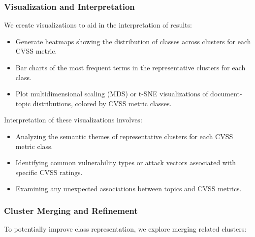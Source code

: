 \documentclass[12pt]{article}
\begin{document}
\subsubsection{Visualization and Interpretation}

We create visualizations to aid in the interpretation of results:

\begin{itemize}

	\item Generate heatmaps showing the distribution of classes across clusters for each CVSS metric.

	\item Bar charts of the most frequent terms in the representative clusters for each class.

	\item Plot multidimensional scaling (MDS) or t-SNE visualizations of document-topic distributions, colored by CVSS metric classes.

\end{itemize}

Interpretation of these visualizations involves:

\begin{itemize}

	\item Analyzing the semantic themes of representative clusters for each CVSS metric class.

	\item Identifying common vulnerability types or attack vectors associated with specific CVSS ratings.

	\item Examining any unexpected associations between topics and CVSS metrics.

\end{itemize}

\subsubsection{Cluster Merging and Refinement}

To potentially improve class representation, we explore merging related clusters:
\end{document}
